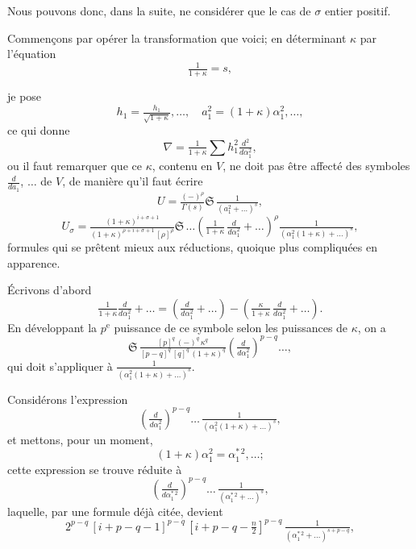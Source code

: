 \documentclass[12pt,a4paper]{article}
\providecommand{\fS}{\mathfrak{S}}
\begin{document}
Nous pouvons donc, dans la suite, ne consid\'erer que le cas de $\sigma$ entier positif.

Commen\c cons par op\'erer la transformation que voici; en d\'eterminant $\kappa$ par l'\'equation
\[
\tfrac{1}{1 + \kappa} = s,
\]

\newpage
\setcounter{page}{199}

je pose
\[
h_1 = \tfrac{h_1}{\sqrt{1 + \kappa}},\ldots,\quad a_1^2 = (1 + \kappa)\alpha_1^2,\ldots,
\]
ce qui donne
\[
\nabla = \tfrac{1}{1 + \kappa}\sum h_1^2\tfrac{d^2}{d\alpha_1^2},
\]
ou il faut remarquer que ce $\kappa$, contenu en $V$, ne doit pas \^etre affect\'e des symboles $\tfrac{d}{da_1}$, $\ldots$ de $V$, de mani\`ere qu'il faut \'ecrire
\[
U = \tfrac{(-)^\rho}{\Gamma(s)}\fS\,\tfrac{1}{(a_1^2 + \ldots)^s},
\]
\[
U_\sigma = \tfrac{(1 + \kappa)^{i + \sigma + 1}}{(1 + \kappa)^{\rho + i + \sigma + 1}\,[\rho]^\rho}\fS\,\ldots\left(\tfrac{1}{1 + \kappa}\,\tfrac{d}{d\alpha_1^2} + \ldots\right)^\rho \tfrac{1}{(\alpha_1^2(1 + \kappa) + \ldots)^s},
\]
formules qui se pr\^etent mieux aux r\'eductions, quoique plus compliqu\'ees en apparence.

\'Ecrivons d'abord
\[
\tfrac{1}{1 + \kappa}\tfrac{d}{d\alpha_1^2} + \ldots = \left(\tfrac{d}{d\alpha_1^2} + \ldots\right) - \left(\tfrac{\kappa}{1 + \kappa}\,\tfrac{d}{d\alpha_1^2} + \ldots\right).
\]
En d\'eveloppant la $p^{\text{e}}$ puissance de ce symbole selon les puissances de $\kappa$, on a
\[
\fS\,\tfrac{[p]^q\,(-)^q\,\kappa^q}{[p - q]^q\,[q]^q\,(1 + \kappa)^q}\left(\tfrac{d}{d\alpha_1^2}\right)^{p - q}\!\!\!\ldots,
\]
qui doit s'appliquer \`a $\tfrac{1}{(\alpha_1^2(1 + \kappa) + \ldots)^s}$.

Consid\'erons l'expression
\[
\left(\tfrac{d}{d\alpha_1^2}\right)^{p - q}\!\!\!\ldots\,\tfrac{1}{(\alpha_1^2(1 + \kappa) + \ldots)^s},
\]
et mettons, pour un moment,
\[
(1 + \kappa)\alpha_1^2 = \alpha_1^{*\,2},\ldots;
\]
cette expression se trouve r\'eduite \`a
\[
\left(\tfrac{d}{d\alpha_1^{*\,2}}\right)^{p - q}\!\!\!\ldots\,\tfrac{1}{(\alpha_1^{*\,2} + \ldots)^s},
\]
laquelle, par une formule d\'ej\`a cit\'ee, devient
\[
2^{p - q}\,[i + p - q - 1]^{p - q}\,[i + p - q - \tfrac{n}{2}]^{p - q}\,\tfrac{1}{(\alpha_1^{*\,2} + \ldots)^{s + p - q}},
\]

\newpage
\setcounter{page}{200}
\end{document}
